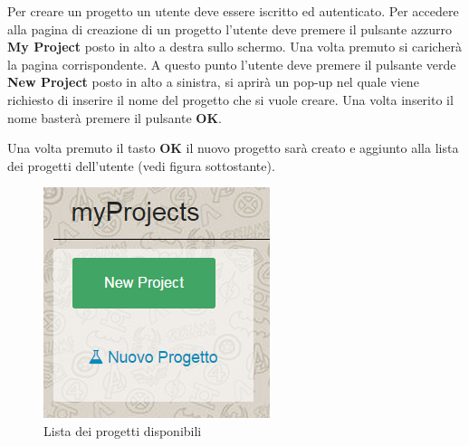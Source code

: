 Per creare un progetto un utente deve essere iscritto ed autenticato. Per accedere alla pagina di creazione di un progetto l'utente deve premere il pulsante azzurro \textbf{My Project} posto in alto a destra sullo schermo. Una volta premuto si caricherà la pagina corrispondente. A questo punto l'utente deve premere il pulsante verde \textbf{New Project} posto in alto a sinistra, si aprirà un pop-up nel quale viene richiesto di inserire il nome del progetto che si vuole creare. Una volta inserito il nome basterà premere il pulsante \textbf{OK}.


\noindent Una volta premuto il tasto \textbf{OK} il nuovo progetto sarà creato e aggiunto alla lista dei progetti dell'utente (vedi figura sottostante).


\begin{figure}[H] 
	\centering 
	\includegraphics[scale=0.60] {img/projectlist.png}
	\caption{Lista dei progetti disponibili} 
\end{figure}